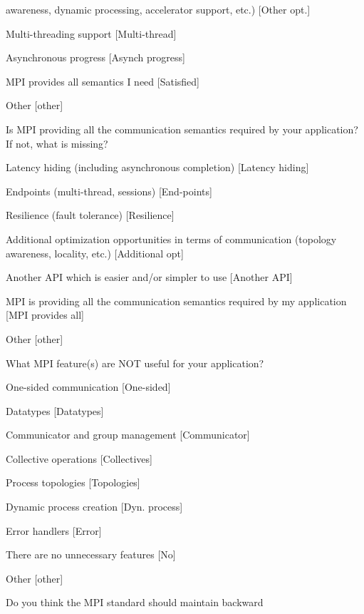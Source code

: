 \documentclass[conference,10pt,letterpaper]{IEEEtran}
\begin{document}
{{\begin{description}
\begin{inparaenum}[{\bf C}1)]
      awareness, dynamic processing, accelerator support, etc.) [Other opt.]
    \item Multi-threading support [Multi-thread]
    \item Asynchronous progress [Asynch progress]
    \item MPI provides all semantics I need [Satisfied]
    \item Other [other]
    \end{inparaenum}
  \item[Q26*:] Is MPI providing all the communication semantics required
    by your application? If not, what is missing? 
    \begin{inparaenum}[{\bf C}1)]
    \item Latency hiding (including asynchronous completion) [Latency hiding]
    \item Endpoints (multi-thread, sessions) [End-points]
    \item Resilience (fault tolerance) [Resilience]
    \item Additional optimization opportunities in terms of communication
      (topology awareness, locality, etc.) [Additional opt]
    \item Another API which is easier and/or simpler to use [Another API]
    \item MPI is providing all the communication semantics required by my
      application [MPI provides all]
    \item Other [other]
    \end{inparaenum}
  \item[Q27*:] What MPI feature(s) are NOT useful for your application?
    \begin{inparaenum}[{\bf C}1)]
    \item One-sided communication [One-sided]
    \item Datatypes [Datatypes]
    \item Communicator and group management [Communicator]
    \item Collective operations [Collectives]
    \item Process topologies [Topologies]
    \item Dynamic process creation [Dyn. process]
    \item Error handlers [Error]
    \item There are no unnecessary features [No]
    \item Other [other]
    \end{inparaenum}
  \item[Q28:] Do you think the MPI standard should maintain backward

\end{description}}}
\end{document}
